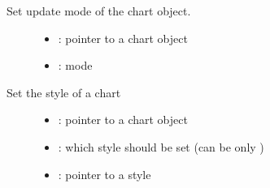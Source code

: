 \documentclass[letterpaper,10pt,english]{sphinxmanual}
\begin{document}
\begin{fulllineitems}
\label{\detokenize{object-types/chart:_CPPv424lv_chart_set_update_modeP8lv_obj_t22lv_chart_update_mode_t}}%
\pysigstartmultiline
{}\label{\detokenize{object-types/chart:lv__chart_8h_1a24582adb1ae15fe098234649dcaa7253}}%
\pysigstopmultiline
Set update mode of the chart object. \begin{description}
\item[{}] \leavevmode\begin{itemize}
\item {} 
: pointer to a chart object 

\item {} 
: mode 

\end{itemize}

\end{description}


\end{fulllineitems}


\begin{fulllineitems}
\label{\detokenize{object-types/chart:_CPPv418lv_chart_set_styleP8lv_obj_t16lv_chart_style_tPK10lv_style_t}}%
\pysigstartmultiline
{}\label{\detokenize{object-types/chart:lv__chart_8h_1a38cb787c1d9e0fa760328d748222735c}}%
\pysigstopmultiline
Set the style of a chart \begin{description}
\item[{}] \leavevmode\begin{itemize}
\item {} 
: pointer to a chart object 

\item {} 
: which style should be set (can be only ) 

\item {} 
: pointer to a style 

\end{itemize}

\end{description}


\end{fulllineitems}
\end{document}

